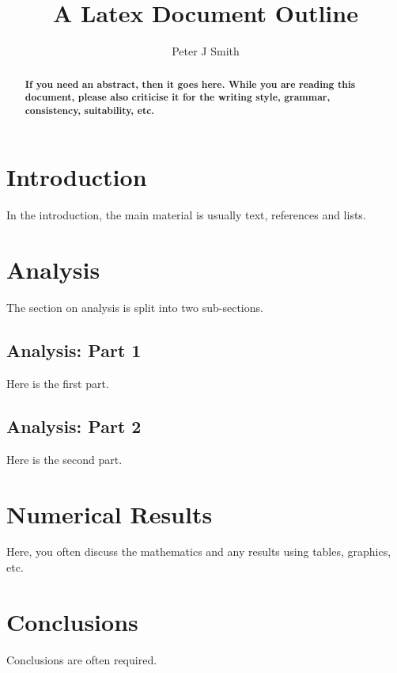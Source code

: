 \documentclass{article}
\begin{document}
\title{A Latex Document Outline}

\author{Peter J Smith}

\maketitle

\begin{abstract}
\textbf{If you need an abstract, then it goes here. While you are reading this document, please also criticise it for the writing style, grammar, consistency, suitability, etc. }
\end{abstract}

\section{Introduction}
In the introduction, the main material is usually text, references and lists. 

\section{Analysis}
The section on analysis is split into two sub-sections. 

\subsection{Analysis: Part 1}
Here is the first part.

\subsection{Analysis: Part 2}
Here is the second part.

\section{Numerical Results}
 Here, you often discuss the mathematics and any results using tables, graphics, etc.
 
 \section{Conclusions}
 Conclusions are often required.
\end{document}
